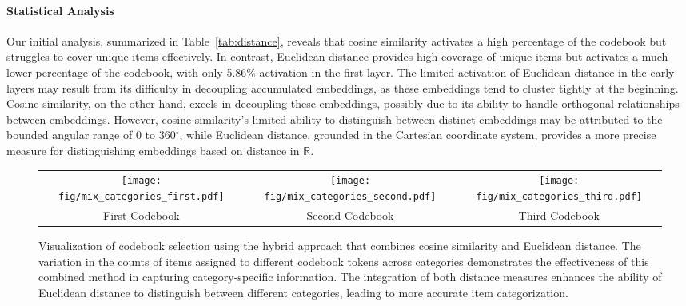 \paragraph{\textbf{Statistical Analysis}} 
Our initial analysis, summarized in Table~\ref{tab:distance}, reveals that cosine similarity activates a high percentage of the codebook but struggles to cover unique items effectively. In contrast, Euclidean distance provides high coverage of unique items but activates a much lower percentage of the codebook, with only 5.86\% activation in the first layer. The limited activation of Euclidean distance in the early layers may result from its difficulty in decoupling accumulated embeddings, as these embeddings tend to cluster tightly at the beginning. Cosine similarity, on the other hand, excels in decoupling these embeddings, possibly due to its ability to handle orthogonal relationships between embeddings. However, cosine similarity’s limited ability to distinguish between distinct embeddings may be attributed to the bounded angular range of 0 to 360$^{\circ}$, while Euclidean distance, grounded in the Cartesian coordinate system, provides a more precise measure for distinguishing embeddings based on distance in \( \mathbb{R} \).





\begin{figure*}[t!]
		\centering
		\begin{tabular}{ccc}
		    	\texttt{[image: fig/mix\_categories\_first.pdf]} &  \texttt{[image: fig/mix\_categories\_second.pdf]} &
       \texttt{[image: fig/mix\_categories\_third.pdf]} 
		     \\ First Codebook & Second Codebook & Third Codebook
		\end{tabular}
  \caption{Visualization of codebook selection using the hybrid approach that combines cosine similarity and Euclidean distance. The variation in the counts of items assigned to different codebook tokens across categories demonstrates the effectiveness of this combined method in capturing category-specific information. The integration of both distance measures enhances the ability of Euclidean distance to distinguish between different categories, leading to more accurate item categorization.}\label{fig:hybrid}
\end{figure*} 

